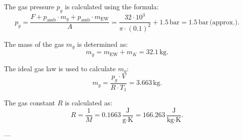 The gas pressure \( p_g \) is calculated using the formula:  
\[
p_g = \frac{F + p_{\text{amb}} \cdot m_g + p_{\text{amb}} \cdot m_{\text{EW}}}{A} = \frac{32 \cdot 10^3}{\pi \cdot (0.1)^2} + 1.5 \, \text{bar} = 1.5 \, \text{bar} \, \text{(approx.)}.
\]  

The mass of the gas \( m_g \) is determined as:  
\[
m_g = m_{\text{EW}} + m_K = 32.1 \, \text{kg}.
\]  

The ideal gas law is used to calculate \( m_g \):  
\[
m_g = \frac{p_g \cdot V}{R \cdot T_1} = 3.663 \, \text{kg}.
\]  

The gas constant \( R \) is calculated as:  
\[
R = \frac{1}{M} = 0.1663 \, \frac{\text{J}}{\text{g·K}} = 166.263 \, \frac{\text{J}}{\text{kg·K}}.
\]  

---
